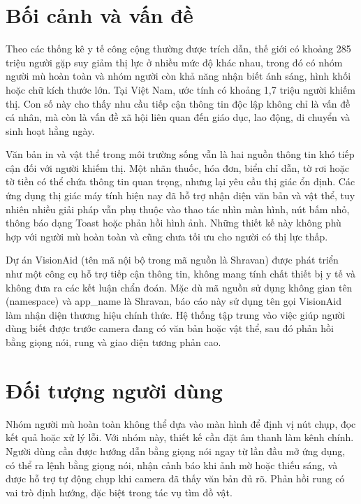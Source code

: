 \documentclass[a4paper,13pt]{report}
\begin{document}
\section{Bối cảnh và vấn đề}

Theo các thống kê y tế công cộng thường được trích dẫn, thế giới có khoảng 285 triệu người gặp suy giảm thị lực ở nhiều mức độ khác nhau, trong đó có nhóm người mù hoàn toàn và nhóm người còn khả năng nhận biết ánh sáng, hình khối hoặc chữ kích thước lớn. Tại Việt Nam, ước tính có khoảng 1,7 triệu người khiếm thị. Con số này cho thấy nhu cầu tiếp cận thông tin độc lập không chỉ là vấn đề cá nhân, mà còn là vấn đề xã hội liên quan đến giáo dục, lao động, di chuyển và sinh hoạt hằng ngày.

Văn bản in và vật thể trong môi trường sống vẫn là hai nguồn thông tin khó tiếp cận đối với người khiếm thị. Một nhãn thuốc, hóa đơn, biển chỉ dẫn, tờ rơi hoặc tờ tiền có thể chứa thông tin quan trọng, nhưng lại yêu cầu thị giác ổn định. Các ứng dụng thị giác máy tính hiện nay đã hỗ trợ nhận diện văn bản và vật thể, tuy nhiên nhiều giải pháp vẫn phụ thuộc vào thao tác nhìn màn hình, nút bấm nhỏ, thông báo dạng Toast hoặc phản hồi hình ảnh. Những thiết kế này không phù hợp với người mù hoàn toàn và cũng chưa tối ưu cho người có thị lực thấp.

Dự án VisionAid (tên mã nội bộ trong mã nguồn là Shravan) được phát triển như một công cụ hỗ trợ tiếp cận thông tin, không mang tính chất thiết bị y tế và không đưa ra các kết luận chẩn đoán. Mặc dù mã nguồn sử dụng không gian tên (namespace) và app\_name là Shravan, báo cáo này sử dụng tên gọi VisionAid làm nhận diện thương hiệu chính thức. Hệ thống tập trung vào việc giúp người dùng biết được trước camera đang có văn bản hoặc vật thể, sau đó phản hồi bằng giọng nói, rung và giao diện tương phản cao.

\section{Đối tượng người dùng}

Nhóm người mù hoàn toàn không thể dựa vào màn hình để định vị nút chụp, đọc kết quả hoặc xử lý lỗi. Với nhóm này, thiết kế cần đặt âm thanh làm kênh chính. Người dùng cần được hướng dẫn bằng giọng nói ngay từ lần đầu mở ứng dụng, có thể ra lệnh bằng giọng nói, nhận cảnh báo khi ảnh mờ hoặc thiếu sáng, và được hỗ trợ tự động chụp khi camera đã thấy văn bản đủ rõ. Phản hồi rung có vai trò định hướng, đặc biệt trong tác vụ tìm đồ vật.
\end{document}
